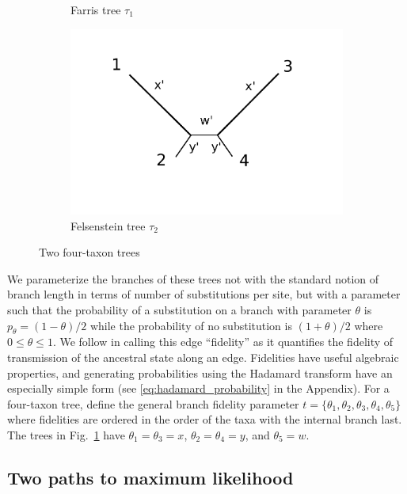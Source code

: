 \documentclass{article}
\begin{document}
\begin{figure}
\begin{subfigure}{.45\linewidth}
\caption[short]{Farris tree $\tau_1$}
\end{subfigure}
\begin{subfigure}{.45\linewidth}
\centering
\includegraphics[width=.95\textwidth]{felsenstein_blank}
\caption[short]{Felsenstein tree $\tau_2$}
\end{subfigure}
\caption{Two four-taxon trees}
\label{fig:farris-fels-top}
\end{figure}

We parameterize the branches of these trees not with the standard notion of branch length in terms of number of substitutions per site, but with a parameter such that the probability of a substitution on a branch with parameter $\theta$ is $p_\theta = (1-\theta)/2$ while the probability of no substitution is $(1+\theta)/2$ where $0 \le \theta \le 1$.
We follow \cite{Matsen2007-jq} in calling this edge ``fidelity'' as it quantifies the fidelity of transmission of the ancestral state along an edge.
Fidelities have useful algebraic properties, and generating probabilities using the Hadamard transform have an especially simple form (see \eqref{eq:hadamard_probability} in the Appendix).
For a four-taxon tree, define the general branch fidelity parameter $t=\{\theta_1,\theta_2,\theta_3,\theta_4,\theta_5\}$ where fidelities are ordered in the order of the taxa with the internal branch last.
The trees in Fig.~\ref{fig:farris-fels-top} have $\theta_1=\theta_3=x$, $\theta_2=\theta_4=y$, and $\theta_5=w$.

\subsection*{Two paths to maximum likelihood}
\end{document}
